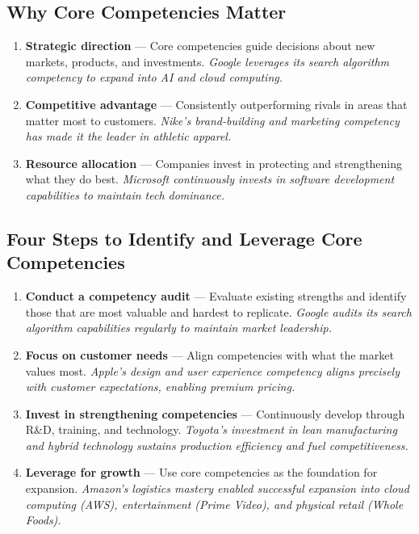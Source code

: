 \documentclass[11pt, letterpaper]{article}
\begin{document}
\subsection{Why Core Competencies Matter}

\begin{enumerate}[leftmargin=*, label=\textbf{\arabic*.}]
  \item \textbf{Strategic direction} --- Core competencies guide decisions about new markets, products, and investments. \textit{Google leverages its search algorithm competency to expand into AI and cloud computing.}
  \item \textbf{Competitive advantage} --- Consistently outperforming rivals in areas that matter most to customers. \textit{Nike's brand-building and marketing competency has made it the leader in athletic apparel.}
  \item \textbf{Resource allocation} --- Companies invest in protecting and strengthening what they do best. \textit{Microsoft continuously invests in software development capabilities to maintain tech dominance.}
\end{enumerate}

\subsection{Four Steps to Identify and Leverage Core Competencies}

\begin{enumerate}[leftmargin=*, label=\textbf{Step \arabic*.}]
  \item \textbf{Conduct a competency audit} --- Evaluate existing strengths and identify those that are most valuable and hardest to replicate. \textit{Google audits its search algorithm capabilities regularly to maintain market leadership.}
  \item \textbf{Focus on customer needs} --- Align competencies with what the market values most. \textit{Apple's design and user experience competency aligns precisely with customer expectations, enabling premium pricing.}
  \item \textbf{Invest in strengthening competencies} --- Continuously develop through R\&D, training, and technology. \textit{Toyota's investment in lean manufacturing and hybrid technology sustains production efficiency and fuel competitiveness.}
  \item \textbf{Leverage for growth} --- Use core competencies as the foundation for expansion. \textit{Amazon's logistics mastery enabled successful expansion into cloud computing (AWS), entertainment (Prime Video), and physical retail (Whole Foods).}
\end{enumerate}
\end{document}
